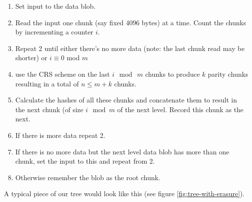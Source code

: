 \begin{enumerate}
\item Set input to the data blob.
\item Read the input one chunk (say fixed 4096 bytes) at a time. Count the chunks by incrementing a counter $i$. 
\item Repeat 2 until either there's no more data (note: the last chunk read may be shorter) or $i \equiv 0$ mod $m$
\item use the CRS scheme on the last $i \mod\ m$ chunks to produce $k$ parity chunks resulting in a total of $n \leq m+k$ chunks.
\item Calculate the hashes of all these chunks and concatenate them to result in the next chunk (of size $i\mod m$ of the next level. Record this chunk as the next.
\item If there is more data repeat 2. 
\item If there is no more data but the next level data blob has more than one chunk, set the input to this and repeat from 2.
\item Otherwise remember the blob as the root chunk.
\end{enumerate}


A typical piece of our tree would look like this (see figure \ref{fig:tree-with-erasure}).


